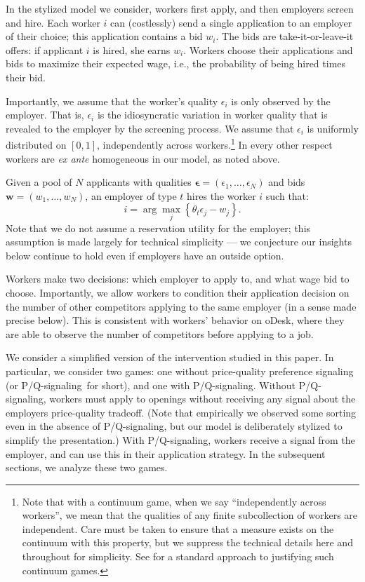 \documentclass[11pt]{article}
\renewcommand{\v}[1]{\ensuremath{\boldsymbol{#1}}}
\newcommand{\hottowel}{P/Q-signaling}
\begin{document}
In the stylized model we consider, workers first apply, and then employers screen and hire.
Each worker $i$ can (costlessly) send a single application to an employer of their choice; this application contains a bid $w_i$. 
The bids are take-it-or-leave-it offers: if applicant $i$ is hired, she earns $w_i$.
Workers choose their applications and bids to maximize their expected wage, i.e., the probability of being hired times their bid.  

Importantly, we assume that the worker's quality $\epsilon_i$ is only observed by the employer.
That is, $\epsilon_i$ is the idiosyncratic variation in worker quality that is revealed to the employer by the screening process.
We assume that $\epsilon_i$ is uniformly distributed on $[0,1]$, independently across workers.\footnote{Note that with a continuum game, when we say ``independently across workers'', we mean that the qualities of any finite subcollection of workers are independent.
Care must be taken to ensure that a measure exists on the continuum with this property, but we suppress the technical details here and throughout for simplicity.
See \cite{duffie_sun} for a standard approach to justifying such continuum games.}
In every other respect workers are {\em ex ante} homogeneous in our model, as noted above.

Given a pool of $N$ applicants with qualities $\v{\epsilon} = (\epsilon_1, \ldots, \epsilon_N)$ and bids $\v{w} = (w_1, \ldots, w_N)$, an employer of type $t$ hires the worker $i$ such that:
\begin{equation}
\label{eq:emp_hiring}
i = \arg \max_j \left\{ \theta_t \epsilon_j - w_j \right\}.
\end{equation}
Note that we do not assume a reservation utility for the employer;
this assumption is made largely for technical simplicity ---
we conjecture our insights below continue to hold even if employers have an outside option.

Workers make two decisions: which employer to apply to, and what wage bid to choose.
Importantly, we allow workers to condition their application decision on the number of other competitors applying to the same employer (in a sense made precise below).
This is consistent with workers' behavior on oDesk, where they are able to observe the number of competitors before applying to a job.

We consider a simplified version of the intervention studied in this paper.
In particular, we consider two games: one without price-quality preference signaling (or \hottowel~for short), and one with \hottowel.  
Without \hottowel, workers must apply to openings without receiving any signal about the employers price-quality tradeoff.
(Note that empirically we observed some sorting even in the absence of \hottowel, but our model is deliberately stylized to simplify the presentation.)
With \hottowel, workers receive a signal from the employer, and can use this in their application strategy.
In the subsequent sections, we analyze these two games.
\end{document}
